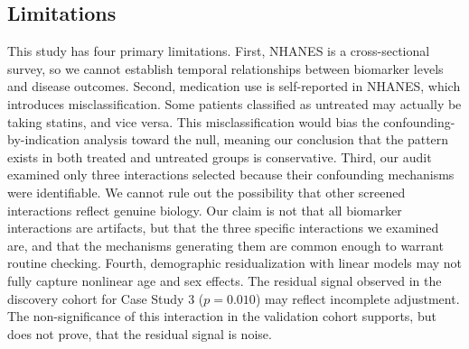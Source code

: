 \documentclass[10pt,letterpaper]{article}
\begin{document}
\subsection{Limitations}
This study has four primary limitations. First, NHANES is a cross-sectional survey, so we cannot establish temporal relationships between biomarker levels and disease outcomes. Second, medication use is self-reported in NHANES, which introduces misclassification. Some patients classified as untreated may actually be taking statins, and vice versa. This misclassification would bias the confounding-by-indication analysis toward the null, meaning our conclusion that the pattern exists in both treated and untreated groups is conservative. Third, our audit examined only three interactions selected because their confounding mechanisms were identifiable. We cannot rule out the possibility that other screened interactions reflect genuine biology. Our claim is not that all biomarker interactions are artifacts, but that the three specific interactions we examined are, and that the mechanisms generating them are common enough to warrant routine checking. Fourth, demographic residualization with linear models may not fully capture nonlinear age and sex effects. The residual signal observed in the discovery cohort for Case Study 3 ($p = 0.010$) may reflect incomplete adjustment. The non-significance of this interaction in the validation cohort supports, but does not prove, that the residual signal is noise.

\end{document}
